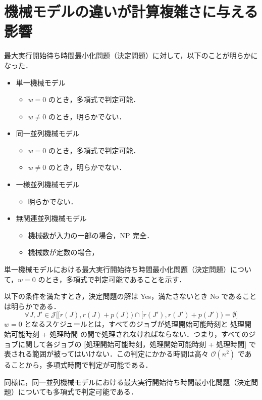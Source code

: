 \documentclass[12pt]{optlab-bachelor}
\begin{document}
\section{機械モデルの違いが計算複雑さに与える影響}
最大実行開始待ち時間最小化問題（決定問題）に対して，以下のことが明らかになった．
\begin{itemize}
  \item 単一機械モデル
  \begin{itemize}
    \item $w = 0$ のとき，多項式で判定可能．
    \item $w \neq 0$ のとき，明らかでない．
  \end{itemize}
  \item 同一並列機械モデル
  \begin{itemize}
    \item $w = 0$ のとき，多項式で判定可能．
    \item $w \neq 0$ のとき，明らかでない．
  \end{itemize}
  \item 一様並列機械モデル
  \begin{itemize}
    \item 明らかでない．
  \end{itemize}
  \item 無関連並列機械モデル
  \begin{itemize}
    \item 機械数が入力の一部の場合，NP 完全．
    \item 機械数が定数の場合，
  \end{itemize}
\end{itemize}

単一機械モデルにおける最大実行開始待ち時間最小化問題（決定問題）について，$w = 0$ のとき，多項式で判定可能であることを示す．

以下の条件を満たすとき，決定問題の解は Yes，満たさないとき No であることは明らかである．
$$\forall J,J' \in \mathcal{J}\big[[r(J),r(J) + p(J)) \cap [r(J'),r(J') + p(J')) = \emptyset\big]$$
$w = 0$ となるスケジュールとは，すべてのジョブが処理開始可能時刻と 処理開始可能時刻 + 処理時間 の間で処理されなければならない．つまり，すべてのジョブに関して各ジョブの [処理開始可能時刻，処理開始可能時刻 + 処理時間] で表される範囲が被ってはいけない．この判定にかかる時間は高々 $\mathcal{O}(n^2)$ であることから，多項式時間で判定が可能である．


同様に，同一並列機械モデルにおける最大実行開始待ち時間最小化問題（決定問題）についても多項式で判定可能である．
\end{document}
